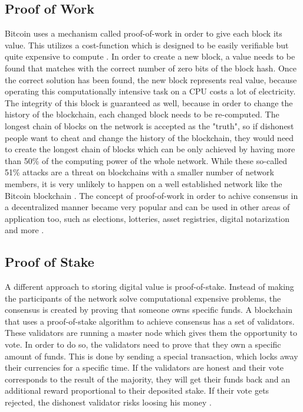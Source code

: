 \subsection{Proof of Work}
Bitcoin uses a mechanism called proof-of-work in order to give each block its value. This utilizes a cost-function which is designed to be easily verifiable but quite expensive to compute \cite{Back2002}. In order to create a new block, a value needs to be found that matches with the correct number of zero bits of the block hash. Once the correct solution has been found, the new block represents real value, because operating this computationally intensive task on a CPU costs a lot of electricity. The integrity of this block is guaranteed as well, because in order to change the history of the blockchain, each changed block needs to be re-computed. The longest chain of blocks on the network is accepted as the "truth", so if dishonest people want to cheat and change the history of the blockchain, they would need to create the longest chain of blocks which can be only achieved by having more than 50\% of the computing power of the whole network. While these so-called 51\% attacks are a threat on blockchains with a smaller number of network members, it is very unlikely to happen on a well established network like the Bitcoin blockchain \cite{Swan2015}. The concept of proof-of-work in order to achive consensus in a decentralized manner became very popular and can be used in other areas of application too, such as elections, lotteries, asset registries, digital notarization and more \cite{Antonopoulos2017}.

\subsection{Proof of Stake}
A different approach to storing digital value is proof-of-stake. Instead of making the participants of the network solve computational expensive problems, the consensus is created by proving that someone owns specific funds. A blockchain that uses a proof-of-stake algorithm to achieve consensus has a set of validators. These validators are running a master node which gives them the opportunity to vote. In order to do so, the validators need to prove that they own a specific amount of funds. This is done by sending a special transaction, which locks away their currencies for a specific time. If the validators are honest and their vote corresponds to the result of the majority, they will get their funds back and an additional reward proportional to their deposited stake. If their vote gets rejected, the dishonest validator risks loosing his money \cite{AntonopoulosWood2018}.

